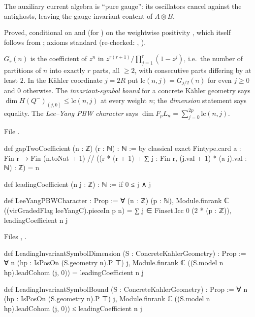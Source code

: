 \begin{physics}
The auxiliary current algebra is ``pure gauge'': its oscillators cancel against the antighosts, leaving the gauge-invariant content of $A\otimes B$.
\end{physics}

\begin{status}
Proved, conditional on  and (for ) on the weightwise positivity , which itself follows from ;
axioms standard (re-checked: , ).
\end{status}

\begin{definition}\label{l28:def:gaptwo}
$G_r(n)$ is the coefficient of $z^n$ in $z^{r(r+1)}/\prod_{j=1}^r(1-z^j)$, i.e.\ the number of partitions of $n$ into exactly $r$ parts, all $\ge2$,
with consecutive parts differing by at least $2$. In the Kähler coordinate $j=2R$ put $\mathrm{lc}(n,j)=G_{j/2}(n)$ for even $j\ge0$ and $0$
otherwise. The \emph{invariant-symbol bound} for a concrete Kähler geometry says $\dim H(Q^-)_{(j,0)}\le\mathrm{lc}(n,j)$ at every weight $n$; the
\emph{dimension} statement says equality. The \emph{Lee--Yang PBW character} says $\dim F_pL_n=\sum_{j=0}^{2p}\mathrm{lc}(n,j)$.
\end{definition}

\noindent File .
\begin{leancode}
def gapTwoCoefficient (n : ℤ) (r : ℕ) : ℕ := by
  classical
  exact Fintype.card {a : Fin r → Fin (n.toNat + 1) //
    ((r * (r + 1) + ∑ j : Fin r, (j.val + 1) * (a j).val : ℕ) : ℤ) = n}

def leadingCoefficient (n j : ℤ) : ℕ :=
  if 0 ≤ j ∧ j %

def LeeYangPBWCharacter : Prop :=
  ∀ (n : ℤ) (p : ℕ),
    Module.finrank ℂ ((virGradedFlag leeYangC).pieceIn p n) =
      ∑ j ∈ Finset.Icc 0 (2 * (p : ℤ)), leadingCoefficient n j
\end{leancode}
\noindent Files , .
\begin{leancode}
def LeadingInvariantSymbolDimension (S : ConcreteKahlerGeometry) : Prop :=
  ∀ n (hp : IsPosOn (S.geometry n).P ⊤) j,
    Module.finrank ℂ ((S.model n hp).leadCohom (j, 0)) = leadingCoefficient n j

def LeadingInvariantSymbolBound (S : ConcreteKahlerGeometry) : Prop :=
  ∀ n (hp : IsPosOn (S.geometry n).P ⊤) j,
    Module.finrank ℂ ((S.model n hp).leadCohom (j, 0)) ≤ leadingCoefficient n j
\end{leancode}

